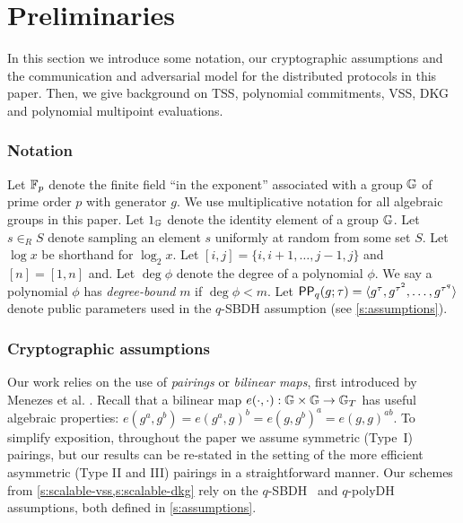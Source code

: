\section{Preliminaries}
\label{s:prelim}
In this section we introduce some notation, our cryptographic assumptions and the communication and adversarial model for the distributed protocols in this paper.
Then, we give background on TSS, polynomial commitments, VSS, DKG and polynomial multipoint evaluations.

\subsubsection{Notation}
\label{s:prelim:notation}
Let $\mathbb{F}_p$ denote the finite field ``in the exponent'' associated with a group $\mathbb{G}$ of prime order $p$ with generator $g$.
We use multiplicative notation for all algebraic groups in this paper.
Let $1_{\mathbb{G}}$ denote the identity element of a group $\mathbb{G}$.
Let $s \in_R S$ denote sampling an element $s$ uniformly at random from some set $S$.
Let $\log{x}$ be shorthand for $\log_2{x}$.
Let $[i,j] = \{i,i+1,\dots,j-1,j\}$ and $[n] = [1,n]$ and.
Let $\deg{\phi}$ denote the degree of a polynomial $\phi$.
We say a polynomial $\phi$ has \textit{degree-bound} $m$ if $\deg{\phi} < m$.
Let $\mathsf{PP}_q(g;\tau) = \langle g^\tau, g^{\tau^2}, \dots, g^{\tau^q}\rangle$ denote public parameters used in the $q$-SBDH assumption (see \cref{s:assumptions}).

\subsubsection{Cryptographic assumptions}
\label{s:prelim:cryptographic-assumptions}
Our work relies on the use of \emph{pairings} or \emph{bilinear maps}, first introduced by Menezes et al. \cite{mov-attack}.
Recall that a bilinear map $e(\cdot,\cdot) : \mathbb{G} \times \mathbb{G} \rightarrow \mathbb{G}_T$ has useful algebraic properties: $e(g^a, g^b) = e(g^a, g)^b = e(g, g^b)^a = e(g, g)^{ab}$.
To simplify exposition, throughout the paper we assume symmetric (Type~I) pairings, but our results can be re-stated in the setting of the more efficient asymmetric (Type II and III) pairings in a straightforward manner.
Our schemes from \cref{s:scalable-vss,s:scalable-dkg} rely on the $q$-SBDH~\cite{qsbdh} and $q$-polyDH~\cite{polycommit} assumptions, both defined in \cref{s:assumptions}.

